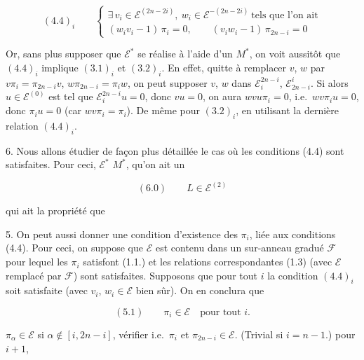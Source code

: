 \documentclass[11pt,a4paper]{article}
\begin{document}
\[ (4.4)_{i} \qquad \begin{cases} \exists\, v_{i} \in \mathcal{E}^{(2n-2i)},\ w_{i} \in \mathcal{E}^{-(2n-2i)} \ \text{tels que l'on ait} \\[2pt] (w_{i} v_{i} - 1)\, \pi_{i} = 0 , \qquad (v_{i} w_{i} - 1)\, \pi_{2n-i} = 0 \end{cases} \]

Or, sans plus supposer que $\mathcal{E}^{*}$ se réalise à l'aide d'un $M^{*}$,
on voit aussitôt que $(4.4)_{i}$ implique $(3.1)_{i}$ et $(3.2)_{i}$. En effet,
quitte à remplacer $v$, $w$ par $v \pi_{i} = \pi_{2n-i} v$,
$w \pi_{2n-i} = \pi_{i} w$, on peut supposer $v$, $w$ dans
$\mathcal{E}^{2n-i}_{i}$, $\mathcal{E}^{i}_{2n-i}$. Si alors
 $u \in \mathcal{E}^{(0)}$ est tel que
$\mathcal{E}^{2n-i}_{i} u = 0$, donc $v u = 0$, on aura
$w v u \pi_{i} = 0$, i.e.\ $w v \pi_{i} u = 0$, donc $\pi_{i} u = 0$ (car
$w v \pi_{i} = \pi_{i}$). De même pour $(3.2)_{i}$, en utilisant la dernière
relation $(4.4)_{i}$.


6. Nous allons étudier de façon plus détaillée le cas où les conditions (4.4)
sont satisfaites. Pour ceci,  $\mathcal{E}^{*}$  \ill{} $M^{*}$,
 qu'on ait un

\[ (6.0) \qquad L \in \mathcal{E}^{(2)} \]

qui ait la propriété que


5. On peut aussi donner une condition d'existence des $\pi_{i}$, liée aux
conditions (4.4). Pour ceci, on suppose que $\mathcal{E}$ est contenu dans un
sur-anneau gradué $\mathcal{F}$  pour lequel les $\pi_{i}$ satisfont (1.1.)
et les relations correspondantes (1.3) (avec $\mathcal{E}$ remplacé par
$\mathcal{F}$)  sont
satisfaites.  Supposons que pour tout $i$ la condition
$(4.4)_{i}$ soit satisfaite (avec $v_{i}$, $w_{i} \in \mathcal{E}$ bien sûr).
On en conclura que

\[ (5.1) \qquad \pi_{i} \in \mathcal{E} \quad \text{pour tout } i . \]

  \ill{} $\pi_{\alpha} \in
\mathcal{E}$ si $\alpha \notin [i, 2n-i]$,  vérifier \ill{}
 i.e.\ $\pi_{i}$ et $\pi_{2n-i} \in \mathcal{E}$.
(Trivial si $i = n-1$.) 
 pour $i+1$,
\end{document}
